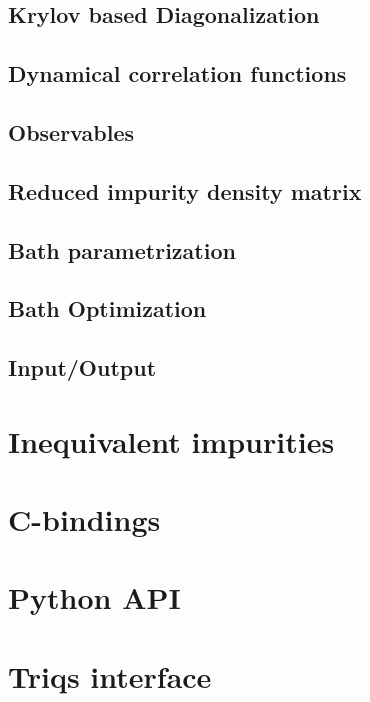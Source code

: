 \documentclass[final,3p,10pt]{elsarticle}
\begin{document}
\subsection{Krylov based Diagonalization}\label{sSecHam}

\subsection{Dynamical correlation functions}\label{sSecGF}

\subsection{Observables}\label{sSecObc}

\subsection{Reduced impurity density matrix}\label{sSecRDM}

\subsection{Bath parametrization}\label{sSecBath}

\subsection{Bath Optimization}\label{sSecFit}

\subsection{Input/Output}\label{sSecIO}




\section{Inequivalent impurities}

\section{C-bindings}\label{SecCbind}

\section{Python API}

\section{Triqs interface}\label{SecEDI2Triqs}
\end{document}
